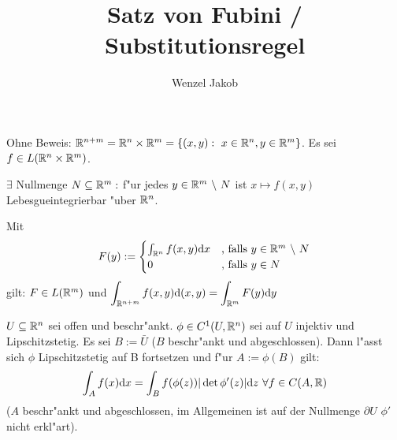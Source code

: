 \documentclass{article}
\title{Satz von Fubini / Substitutionsregel}
\author{Wenzel Jakob}
\begin{document}
\maketitle

\begin{satz}
Ohne Beweis:
$\mathbb{R}^{n+m}=\mathbb{R}^n\times\mathbb{R}^m=\{(x,y):\ x\in\mathbb{R}^n, y\in\mathbb{R}^m\}$. Es sei $f\in L(\mathbb{R}^n\times\mathbb{R}^m)$.
\begin{liste}
\item $\exists$ Nullmenge $N\subseteq\mathbb{R}^m:$ f"ur jedes $y\in\mathbb{R}^m\ \backslash\ N$ ist $x\mapsto f(x,y)$ Lebesgueintegrierbar "uber $\mathbb{R}^n$.
\item Mit
\[
	F(y):=\begin{cases}
		\int_{\MdR^n}f(x,y)\text{d}x&\text{, falls } y\in\MdR^m\ \backslash\ N\\
		0 &\text{, falls } y\in N
	\end{cases}
\]
gilt: $F\in L(\mathbb{R}^m)$ und $\displaystyle\int_{\mathbb{R}^{n+m}}f(x,y)\text{d}(x,y)=\displaystyle\int_{\mathbb{R}^m}F(y)\text{d}y$
\end{liste}
\end{satz}

\begin{satz}[Substitutionsregel]
$U\subseteq\mathbb{R}^n$ sei offen und beschr"ankt. $\phi\in C^1(U,\mathbb{R}^n)$ sei auf $U$ injektiv und Lipschitzstetig. Es sei $B:=\bar{U}$
($B$ beschr"ankt und abgeschlossen). Dann l"asst sich $\phi$ Lipschitzstetig auf B fortsetzen und f"ur $A:=\phi(B)$ gilt:
\[
	\int_A f(x)\text{d}x=\int_B f(\phi(z))|\det\phi'(z)|\text{d}z\ \forall f\in C(A,\mathbb{R})
\]
($A$ beschr"ankt und abgeschlossen, im Allgemeinen ist auf der Nullmenge $\partial U$ $\phi'$ nicht erkl"art).
\end{satz}
\end{document}
